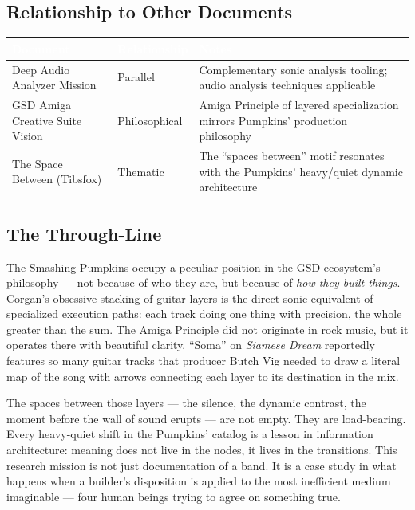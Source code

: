 \documentclass[11pt,letterpaper]{article}
\newcommand{\tableheader}[1]{\textbf{\sffamily\textcolor{white}{#1}}}
\begin{document}
\subsection{Relationship to Other Documents}

\begin{center}
\begin{tabularx}{\textwidth}{L{3.5cm}L{2.5cm}X}
\toprule
{}
\tableheader{Document} & \tableheader{Relationship} & \tableheader{Notes} \\
\midrule
Deep Audio Analyzer Mission & Parallel & Complementary sonic analysis tooling; audio analysis techniques applicable \\
GSD Amiga Creative Suite Vision & Philosophical & Amiga Principle of layered specialization mirrors Pumpkins' production philosophy \\
The Space Between (Tibsfox) & Thematic & The ``spaces between'' motif resonates with the Pumpkins' heavy/quiet dynamic architecture \\
\bottomrule
\end{tabularx}
\end{center}

\subsection{The Through-Line}

The Smashing Pumpkins occupy a peculiar position in the GSD ecosystem's philosophy --- not because of who they are, but because of \textit{how they built things}. Corgan's obsessive stacking of guitar layers is the direct sonic equivalent of specialized execution paths: each track doing one thing with precision, the whole greater than the sum. The Amiga Principle did not originate in rock music, but it operates there with beautiful clarity. ``Soma'' on \textit{Siamese Dream} reportedly features so many guitar tracks that producer Butch Vig needed to draw a literal map of the song with arrows connecting each layer to its destination in the mix.

The spaces between those layers --- the silence, the dynamic contrast, the moment before the wall of sound erupts --- are not empty. They are load-bearing. Every heavy-quiet shift in the Pumpkins' catalog is a lesson in information architecture: meaning does not live in the nodes, it lives in the transitions. This research mission is not just documentation of a band. It is a case study in what happens when a builder's disposition is applied to the most inefficient medium imaginable --- four human beings trying to agree on something true.
\end{document}

